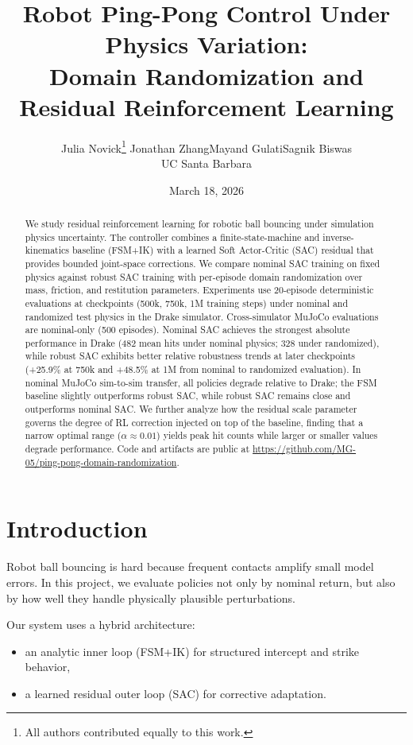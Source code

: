 \documentclass[10pt,twocolumn,letterpaper]{article}
\title{Robot Ping-Pong Control Under Physics Variation:\\
Domain Randomization and Residual Reinforcement Learning}
\author{
Julia Novick\thanks{All authors contributed equally to this work.} \quad Jonathan Zhang\footnotemark[1] \quad Mayand Gulati\footnotemark[1] \quad Sagnik Biswas\footnotemark[1]\\[4pt]
\normalsize UC Santa Barbara
}
\date{March 18, 2026}
\begin{document}
\raggedbottom
\maketitle

\begin{abstract}
We study residual reinforcement learning for robotic ball bouncing under simulation physics uncertainty. The controller combines a finite-state-machine and inverse-kinematics baseline (FSM+IK) with a learned Soft Actor-Critic (SAC) residual that provides bounded joint-space corrections. We compare nominal SAC training on fixed physics against robust SAC training with per-episode domain randomization over mass, friction, and restitution parameters. Experiments use 20-episode deterministic evaluations at checkpoints (500k, 750k, 1M training steps) under nominal and randomized test physics in the Drake simulator. Cross-simulator MuJoCo evaluations are nominal-only (500 episodes). Nominal SAC achieves the strongest absolute performance in Drake (482 mean hits under nominal physics; 328 under randomized), while robust SAC exhibits better relative robustness trends at later checkpoints (+25.9\% at 750k and +48.5\% at 1M from nominal to randomized evaluation). In nominal MuJoCo sim-to-sim transfer, all policies degrade relative to Drake; the FSM baseline slightly outperforms robust SAC, while robust SAC remains close and outperforms nominal SAC. We further analyze how the residual scale parameter governs the degree of RL correction injected on top of the baseline, finding that a narrow optimal range ($\alpha \approx 0.01$) yields peak hit counts while larger or smaller values degrade performance. Code and artifacts are public at \url{https://github.com/MG-05/ping-pong-domain-randomization}.
\end{abstract}

\section{Introduction}
Robot ball bouncing is hard because frequent contacts amplify small model errors. In this project, we evaluate policies not only by nominal return, but also by how well they handle physically plausible perturbations.

Our system uses a hybrid architecture:
\begin{itemize}[leftmargin=*,noitemsep]
    \item an analytic inner loop (FSM+IK) for structured intercept and strike behavior,
    \item a learned residual outer loop (SAC) for corrective adaptation.
\end{itemize}
\end{document}
